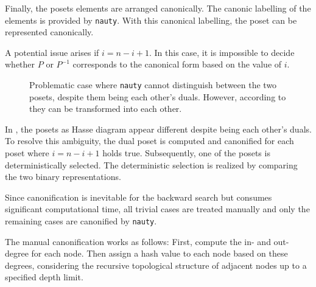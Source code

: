 \documentclass[twoside,leqno,twocolumn]{article}
\begin{document}
Finally, the posets elements are arranged canonically.
The canonic labelling of the elements is provided by \texttt{nauty}.
With this canonical labelling, the poset can be represented canonically.

A potential issue arises if $i = n - i + 1$.
In this case, it is impossible to decide whether $P$ or $P^{-1}$ corresponds to the canonical form based on the value of $i$.

\begin{figure}[!b]
  \centering
  
  \caption{Problematic case where \texttt{nauty} cannot distinguish between the two posets, despite them being each other's duals. However, according to  they can be transformed into each other.} %
  \label{fig:backward_canonify_problematic}
\end{figure}



In , the posets as Hasse diagram appear different despite being each other's duals.
To resolve this ambiguity, the dual poset is computed and canonified for each poset where $i = n - i + 1$ holds true.
Subsequently, one of the posets is deterministically selected.
The deterministic selection is realized by comparing the two binary representations.

Since canonification is inevitable for the backward search but consumes significant computational time, all trivial cases are treated manually and only the remaining cases are canonified by \texttt{nauty}.

The manual canonification works as follows:
First, compute the in- and out-degree for each node.
Then assign a hash value to each node based on these degrees, considering the recursive topological structure of adjacent nodes up to a specified depth limit.
\end{document}
